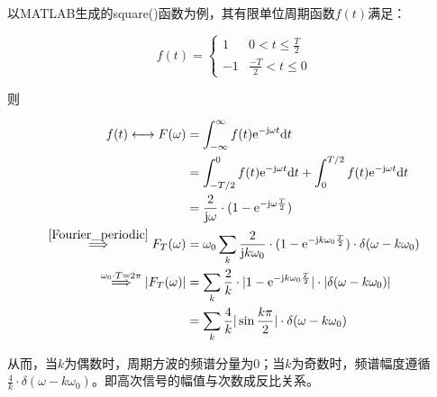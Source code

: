 \documentclass[12pt]{article}
\begin{document}
以MATLAB生成的square()函数为例，其有限单位周期函数$f(t)$满足：
\begin{center}
        {\setlength\abovedisplayskip{-0.5cm}
        
    \begin{equation}
 f(t)=   
\left\{\begin{matrix}
 1 & 0<t\le\frac{T}{2}\\
-1   & \frac{-T}{2}<t\le 0
\end{matrix}\right.
    \end{equation}
    }
\end{center}
则
\begin{center}
        {\setlength\abovedisplayskip{-0.8cm}
       
        \begin{equation}
            \begin{aligned}
                    f(t)\longleftrightarrow F(\omega)&=\int_{-\infty}^{\infty}f(t)\mathrm{e}^{-\mathrm{j}\omega t}\mathrm{d}t\\
                    &=\int_{-T/2}^{0}f(t)\mathrm{e}^{-\mathrm{j}\omega t}\mathrm{d}t+\int_{0}^{T/2}f(t)\mathrm{e}^{-\mathrm{j}\omega t}\mathrm{d}t\\
                    &=\frac{2}{\mathrm{j}\omega}\cdot(1-\mathrm{e}^{-\mathrm{j}\omega \frac{T}{2}})\\
                \stackrel{\ref{Fourier_periodic}}\Longrightarrow F_T(\omega)&= \omega_0 \sum_{k} \frac{2}{\mathrm{j}k\omega_0}\cdot(1-\mathrm{e}^{-\mathrm{j}k\omega_0 \frac{T}{2}})\cdot\delta(\omega-k\omega_0) \\  
                 \stackrel{\omega_0\cdot T=2\pi}\Longrightarrow |F_T(\omega)|&=\sum_k \frac{2}{k}\cdot|1-\mathrm{e}^{-\mathrm{j}k\omega_0 \frac{T}{2}}|\cdot |\delta(\omega-k\omega_0)|\\
                    &=\sum_k \frac{4}{k}|\sin 
                    \frac{k\pi}{2}|\cdot \delta(\omega-k\omega_0)\\
            \end{aligned}
        \end{equation}
        }
        \label{equ_fourier}
\end{center}
从而，当$k$为偶数时，周期方波的频谱分量为0；当$k$为奇数时，频谱幅度遵循$\frac{4}{k}\cdot \delta(\omega-k\omega_0)$。即高次信号的幅值与次数成反比关系。
\end{document}
